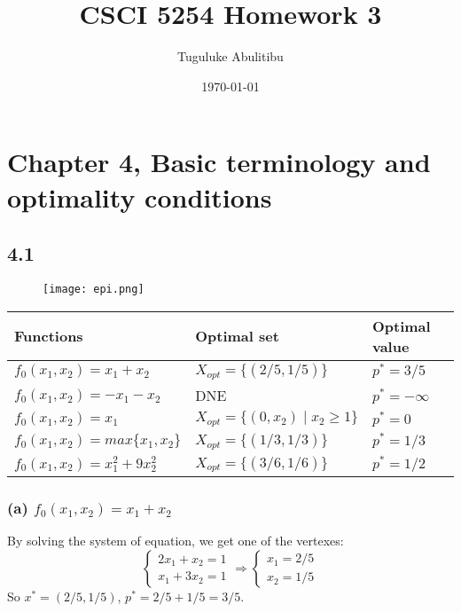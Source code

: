 \documentclass{article}
\title{CSCI 5254  Homework 3}
\author{Tuguluke Abulitibu}
\date\today
\begin{document}
\maketitle %
\section*{Chapter 4, Basic terminology and optimality conditions}	
\subsection*{4.1}
\begin{figure}[h]
\begin{center}
  \texttt{[image: epi.png]}
\end{center}
\end{figure}
\begin{center}
    \begin{tabular}{ | l | l | l |}
    \hline
    Functions & Optimal set   & Optimal value  \\ \hline
        $ f_0(x_1, x_2) = x_1 + x_2$ &  $X_{opt} =  \{(2/5, 1/5)\}$ & $p^*   = 3/5$  \\ \hline
    $ f_0(x_1, x_2) = -x_1 - x_2$ &  DNE & $p^*   =  -\infty$  \\ \hline
        $ f_0(x_1, x_2) = x_1 $ & $X_{opt} =  \{(0, x_2) \mid x_2 \ge 1\} $ &  $p^*  = 0$ \\ \hline
            $ f_0(x_1, x_2) = max \{x_1, x_2\}$ &  $X_{opt} =  \{(1/3, 1/3)\}$ & $p^*   = 1/3$   \\ \hline
                $ f_0(x_1, x_2) = x_1^2 + 9x_2^2$ & $X_{opt} =  \{ (3/6, 1/6)\}$ &  $p^* = 1/2$ \\ \hline

        \end{tabular}
\end{center}

  \subsubsection*{(a) $ f_0(x_1, x_2) = x_1 + x_2$}      
  By solving the system of equation, we get one of the vertexes:
\[ \begin{cases}
            2x_1 + x_2 = 1 \\
            x_1 + 3x_2 = 1
        \end{cases} \Rightarrow
        \begin{cases}
            x_1 = 2/5 \\
           x_2 = 1/5
        \end{cases}  \]
        So $x^* = (2/5, 1/5) $, $p^* = 2/5+  1/5  = 3/5$.
\end{document}
